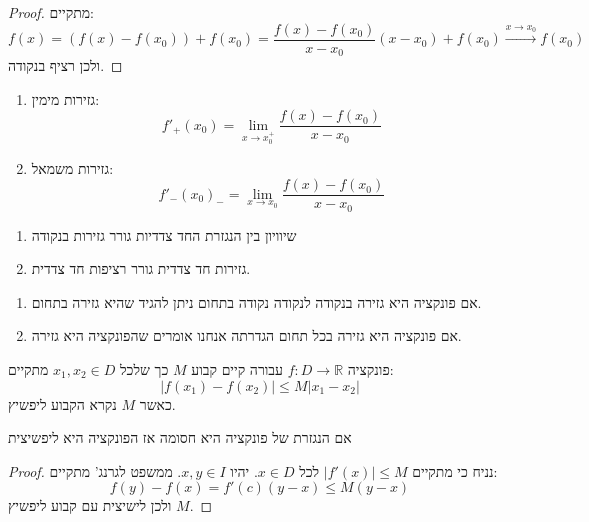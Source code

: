 \documentclass{tstextbook}
\begin{document}
\begin{proof}
מתקיים:
$$f(x)=(f(x)-f(x_{0}))+f(x_{0})=\frac{f(x)-f(x_{0})}{x-x_{0}}(x-x_{0})+f(x_{0})\xrightarrow{x\to x_{0}} f(x_{0})$$
ולכן רציף בנקודה.

\end{proof}
\begin{definition}
  \begin{enumerate}
    \item גזירות מימין: 
$$f'_{+}(x_{0})=\lim_{ x \to x_{0}^{+} } \frac{f(x)-f(x_{0})}{x-x_{0}}$$


    \item גזירות משמאל: 
$$f'_{-}(x_{0})_{-}=\lim_{ x \to x_{0} } \frac{f(x)-f(x_{0})}{x-x_{0}}$$


  \end{enumerate}
\end{definition}
\begin{proposition}
  \begin{enumerate}
    \item שיוויון בין הנגזרת החד צדדיות גורר גזירות בנקודה 


    \item גזירות חד צדדית גורר רציפות חד צדדית. 


  \end{enumerate}
\end{proposition}
\begin{definition}
  \begin{enumerate}
    \item אם פונקציה היא גזירה בנקודה לנקודה נקודה בתחום ניתן להגיד שהיא גזירה בתחום. 


    \item אם פונקציה היא גזירה בכל תחום הגדרתה אנחנו אומרים שהפונקציה היא גזירה. 


  \end{enumerate}
\end{definition}
\begin{definition}
פונקציה \(f:D\to \mathbb{R}\) עבורה קיים קבוע \(M\) כך שלכל \(x_{1},x_{2} \in D\) מתקיים:
$$\lvert f(x_{1})-f(x_{2}) \rvert \leq M|x_{1}-x_{2}|$$
כאשר \(M\) נקרא הקבוע ליפשיץ.

\end{definition}
\begin{proposition}
אם הנגזרת של פונקציה היא חסומה אז הפונקציה היא ליפשיצית

\end{proposition}
\begin{proof}
נניח כי מתקיים \(\lvert f'(x) \rvert\leq M\) לכל \(x \in D\). יהיו \(x,y \in I\). ממשפט לגרנג' מתקיים:
$$f(y)-f(x)=f'(c)(y-x)\leq M(y - x)$$
ולכן לישיצית עם קבוע ליפשיץ \(M\).

\end{proof}
\end{document}
